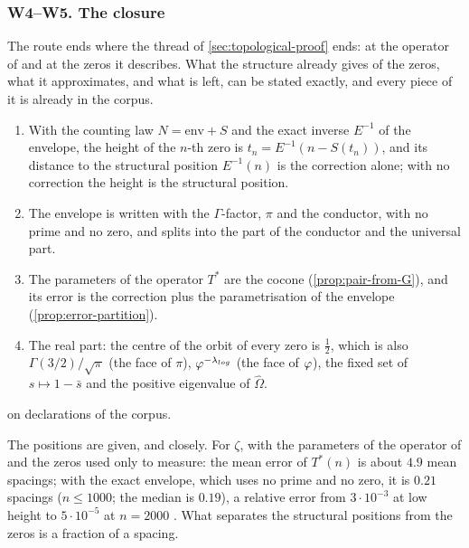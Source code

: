 \subsubsection{W4--W5. The closure}\label{ssec:weil-closure}

The route ends where the thread of \cref{sec:topological-proof} ends: at the operator of \cite{gonzalez25hp}
and at the zeros it describes.  What the structure already gives of the zeros, what it approximates, and what is left,
can be stated exactly, and every piece of it is already in the corpus.

\begin{proposition}\label{prop:positions}
\begin{enumerate}[label=\textup{(\roman*)}]
  \item With the counting law $N=\mathrm{env}+S$ and the exact inverse $E^{-1}$ of the envelope,
    the height of the $n$-th zero is $t_n=E^{-1}(n-S(t_n))$, and its distance to the structural
    position $E^{-1}(n)$ is the correction alone; with no correction the height is the
    structural position.
  \item The envelope is written with the $\Gamma$-factor, $\pi$ and the conductor, with no prime
    and no zero, and splits into the part of the conductor and the universal part.
  \item The parameters of the operator $T^*$ are the cocone (\cref{prop:pair-from-G}), and its error is
    the correction plus the parametrisation of the envelope (\cref{prop:error-partition}).
  \item The real part: the centre of the orbit of every zero is $\tfrac12$, which is also
    $\Gamma(3/2)/\sqrt\pi$ (the face of $\pi$), $\varphi^{-\lambda_{log}}$ (the face of $\varphi$), the
    fixed set of $s\mapsto1-\bar s$ and the positive eigenvalue of $\hat\Omega$.
\end{enumerate}


on declarations of the corpus.
\end{proposition}

The positions are given, and closely.  For $\zeta$, with the parameters of the operator of
\cite{gonzalez25hp} and the zeros used only to measure: the mean error of $T^*(n)$ is about
$4.9$ mean spacings; with the exact envelope, which uses no prime and no zero, it is $0.21$
spacings ($n\le1000$; the median is $0.19$), a relative error from $3\cdot10^{-3}$ at low height to $5\cdot10^{-5}$ at $n=2000$ .  What separates the structural positions from the
zeros is a fraction of a spacing.

